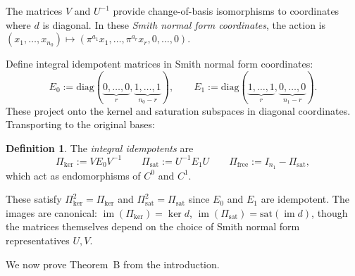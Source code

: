 \documentclass[11pt]{amsart}
\theoremstyle{plain}
\theoremstyle{definition}
\newtheorem{definition}[theorem]{Definition}
\newcommand{\unif}{\pi}                        %
\newcommand{\sat}{\mathrm{sat}}
\newcommand{\free}{\mathrm{free}}
\newcommand{\coboundary}{d}                           %
\DeclareMathOperator{\im}{im}                         %
\begin{document}
The matrices $V$ and $U^{-1}$ provide change-of-basis isomorphisms to coordinates 
where $\coboundary$ is diagonal. In these \emph{Smith normal form coordinates}, 
the action is $(x_1, \ldots, x_{n_0}) \mapsto (\unif^{a_1} x_1, \ldots, \unif^{a_r} x_r, 0, \ldots, 0)$.

Define integral idempotent matrices in Smith normal form coordinates:
\[
E_0 := \mathrm{diag}(\underbrace{0, \ldots, 0}_r, \underbrace{1, \ldots, 1}_{n_0 - r}), 
\qquad
E_1 := \mathrm{diag}(\underbrace{1, \ldots, 1}_r, \underbrace{0, \ldots, 0}_{n_1 - r}).
\]
These project onto the kernel and saturation subspaces in diagonal coordinates. 
Transporting to the original bases:

\begin{definition}
\label{def:projectors}
The \emph{integral idempotents} are
\[
\Pi_{\ker} := V E_0 V^{-1}  \qquad 
\Pi_{\sat} := U^{-1} E_1 U  \qquad 
\Pi_{\free} := I_{n_1} - \Pi_{\sat} ,
\]
which act as endomorphisms of $C^0$ and $C^1$.
\end{definition}

These satisfy $\Pi_{\ker}^2 = \Pi_{\ker}$ and $\Pi_{\sat}^2 = \Pi_{\sat}$ since 
$E_0$ and $E_1$ are idempotent. The images are canonical: $\im(\Pi_{\ker}) = \ker \coboundary$, 
$\im(\Pi_{\sat}) = \sat(\im \coboundary)$, though the matrices themselves depend 
on the choice of Smith normal form representatives $U, V$.

We now prove Theorem~B from the introduction.
\end{document}
